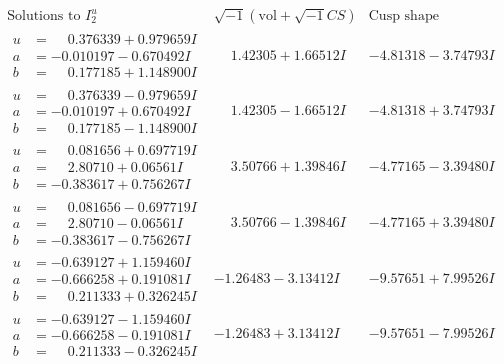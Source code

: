 \documentclass[1p]{elsarticle_modified}
\theoremstyle{definition}
\newcommand{\I}{\sqrt{-1}}
\begin{document}
$$\begin{array}{c|c|c}  
\text{Solutions to }I^u_{2}& \I (\text{vol} + \sqrt{-1}CS) & \text{Cusp shape}\\
 \hline 
\begin{aligned}
u &= \phantom{-}0.376339 + 0.979659 I \\
a &= -0.010197 - 0.670492 I \\
b &= \phantom{-}0.177185 + 1.148900 I\end{aligned}
 & \phantom{-}1.42305 + 1.66512 I & -4.81318 - 3.74793 I \\ \hline\begin{aligned}
u &= \phantom{-}0.376339 - 0.979659 I \\
a &= -0.010197 + 0.670492 I \\
b &= \phantom{-}0.177185 - 1.148900 I\end{aligned}
 & \phantom{-}1.42305 - 1.66512 I & -4.81318 + 3.74793 I \\ \hline\begin{aligned}
u &= \phantom{-}0.081656 + 0.697719 I \\
a &= \phantom{-}2.80710 + 0.06561 I \\
b &= -0.383617 + 0.756267 I\end{aligned}
 & \phantom{-}3.50766 + 1.39846 I & -4.77165 - 3.39480 I \\ \hline\begin{aligned}
u &= \phantom{-}0.081656 - 0.697719 I \\
a &= \phantom{-}2.80710 - 0.06561 I \\
b &= -0.383617 - 0.756267 I\end{aligned}
 & \phantom{-}3.50766 - 1.39846 I & -4.77165 + 3.39480 I \\ \hline\begin{aligned}
u &= -0.639127 + 1.159460 I \\
a &= -0.666258 + 0.191081 I \\
b &= \phantom{-}0.211333 + 0.326245 I\end{aligned}
 & -1.26483 - 3.13412 I & -9.57651 + 7.99526 I \\ \hline\begin{aligned}
u &= -0.639127 - 1.159460 I \\
a &= -0.666258 - 0.191081 I \\
b &= \phantom{-}0.211333 - 0.326245 I\end{aligned}
 & -1.26483 + 3.13412 I & -9.57651 - 7.99526 I \\ \hline\begin{aligned}

\end{aligned}
\end{array}$$
\end{document}
